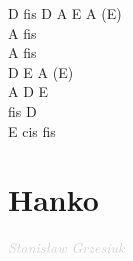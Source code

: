 \documentclass[a5paper, 10pt]{book}
\begin{document}
\begin{minipage}[t]{0.2\textwidth}

  D fis D A E A (E)\\

  A fis\\
  A fis\\
  D E A (E)\\
  A D E\\
  fis D\\
  E cis fis\\
\end{minipage}

\section{Hanko}\textcolor{lightgray}{\textit{Stanisław Grzesiuk}}\\~\\
\end{document}
